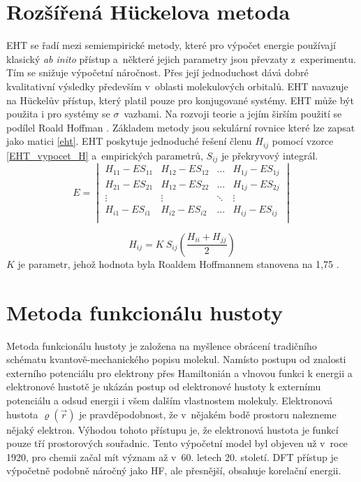 \documentclass[
  printed, %
  table,   %
  lof,     %
  lot,     %
  oneside,
]{fithesis3}
\begin{document}
\section{Rozšířená Hückelova metoda}
EHT se řadí mezi semiempirické metody, které  pro výpočet energie používají klasický \textit{ab inito} přístup a~některé jejich parametry jsou převzaty z~experimentu. Tím se snižuje výpočetní náročnost. Přes její jednoduchost dává dobré kvalitativní výsledky především v~oblasti molekulových orbitalů. EHT navazuje na Hückelův přístup, který platil pouze pro konjugované systémy. EHT může být použita i pro systémy se $\sigma$~vazbami. Na rozvoji teorie a jejím širším použití se podílel Roald Hoffman \cite{lowe2011quantum}. Základem metody jsou sekulární rovnice které lze zapsat jako matici \ref{eht}. EHT poskytuje jednoduché řešení členu $H_{ij}$ pomocí vzorce \ref{EHT_vypocet_H} a~empirických parametrů, $S_{ij}$ je překryvový integrál.
\begin{equation}
E = \begin{vmatrix}
H_{11} - E S_{11} & H_{12} - E S_{12} & \dots & H_{1j} - E S_{1j} \\
H_{21} - E S_{21} & H_{12} - E S_{22} & \dots & H_{1j} - E S_{2j} \\
\vdots & \vdots &  \ddots & \vdots  \\
H_{i1} - E S_{i1} & H_{i2} - E S_{i2} & \dots & H_{ij} - E S_{ij} \\
\end{vmatrix}
\label{eht}
\end{equation}


\begin{equation}
H_{ij} = K~S_{ij} \left( \frac{H_{ii} + H_{jj}}{2} \right)
\label{EHT_vypocet_H}
\end{equation}
$K$ je parametr, jehož hodnota byla Roaldem Hoffmannem stanovena na 1,75 \cite{lowe2011quantum}.

\section{Metoda funkcionálu hustoty}
Metoda funkcionálu hustoty je založena na myšlence obrácení tradičního schématu kvantově-mechanického popisu molekul. Namísto postupu od znalosti externího potenciálu pro elektrony přes Hamiltonián a vlnovou funkci k energii a elektronové hustotě je ukázán postup od elektronové hustoty k externímu potenciálu a odsud energii i všem dalším vlastnostem molekuly.   Elektronová hustota $\varrho(\vec{r})$ je pravděpodobnost, že v~nějakém bodě prostoru nalezneme nějaký elektron.  Výhodou tohoto přístupu je, že elektronová hustota je funkcí pouze tří prostorových souřadnic. Tento výpočetní model byl objeven už v~roce 1920, pro chemii začal mít význam až v~60. letech 20. století. DFT přístup je výpočetně podobně náročný jako HF, ale přesnější, obsahuje korelační energii. \\
\end{document}
